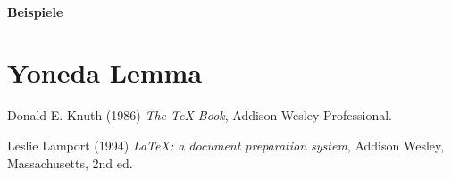 \documentclass{article}
\theoremstyle{plain}
\theoremstyle{definition}
\theoremstyle{remark}
\begin{document}
\paragraph{Beispiele}

\section{Yoneda Lemma}


\begin{thebibliography}{9}
Donald E. Knuth (1986) \emph{The \TeX{} Book}, Addison-Wesley Professional.

Leslie Lamport (1994) \emph{\LaTeX: a document preparation system}, Addison
Wesley, Massachusetts, 2nd ed.
\end{thebibliography}
\end{document}
